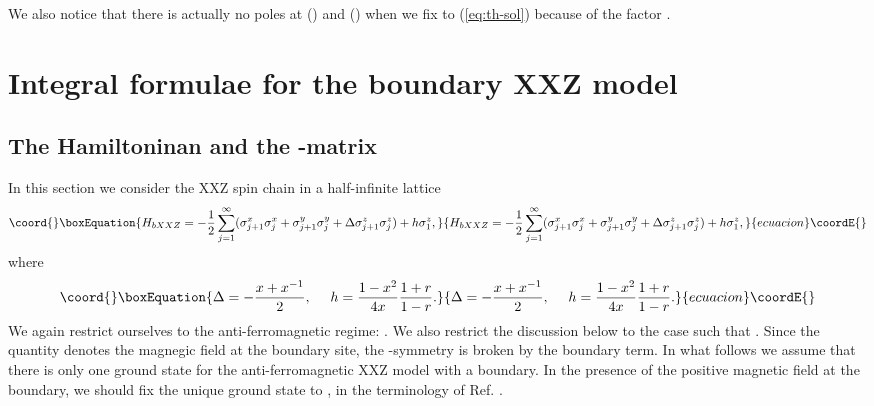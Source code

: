 \documentclass[a4paper,10pt]{article}
\begin{document}
{We also notice that there is actually no poles at 
\coordHE{} (\coordHE{}) and \coordHE{} (\coordHE{}) 
when we fix \coordHE{} to (\ref{eq:th-sol}) 
because of the factor \coordHE{}. 

\section{Integral formulae for the boundary XXZ model}

\subsection{The Hamiltoninan and the \coordHE{}-matrix} 

In this section we consider the XXZ spin chain 
in a half-infinite lattice 
\begin{equation}\coord{}\boxEquation{
H_{bXXZ}=-\frac{1}{2}\sum_{j=1}^\infty 
(\sigma_{j+1}^x \sigma_{j}^x + \sigma_{j+1}^y 
\sigma_{j}^y +\Delta \sigma_{j+1}^z \sigma_{j}^z) 
+h\sigma_{1}^z , 
\label{eq:bXXZ-H}
}{
H_{bXXZ}=-\frac{1}{2}\sum_{j=1}^\infty 
(\sigma_{j+1}^x \sigma_{j}^x + \sigma_{j+1}^y 
\sigma_{j}^y +\Delta \sigma_{j+1}^z \sigma_{j}^z) 
+h\sigma_{1}^z , 
}{ecuacion}\coordE{}\end{equation}
where 
\begin{equation}\coord{}\boxEquation{
\Delta=-\frac{x+x^{-1}}{2}, ~~~~
h=\frac{1-x^2}{4x}\frac{1+r}{1-r}. 
\label{eq:df-h}
}{
\Delta=-\frac{x+x^{-1}}{2}, ~~~~
h=\frac{1-x^2}{4x}\frac{1+r}{1-r}. 
}{ecuacion}\coordE{}\end{equation}
We again restrict ourselves to the anti-ferromagnetic 
regime: \coordHE{}. We also restrict the discussion below 
to the case \coordHE{} such that \coordHE{}. Since 
the quantity \coordHE{} denotes the magnegic field at the boundary 
site, the \coordHE{}-symmetry is broken by the boundary 
term. In what follows we assume that there is only one 
ground state for the anti-ferromagnetic XXZ model with 
a boundary. In the presence of the positive magnetic field 
at the boundary, we should fix the unique ground state 
to \coordHE{}, in the terminology of Ref. \cite{JKKKM}. 

}
\end{document}
